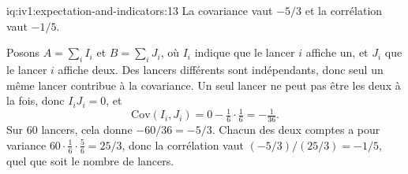 \enlargethispage{-3\baselineskip}%
\begin{solution}{iq:iv1:expectation-and-indicators:13}
La covariance vaut $-5/3$ et la corrélation vaut $-1/5$.

Posons $A = \sum_i I_i$ et $B = \sum_i J_i$, où $I_i$ indique que le lancer $i$ affiche un, et $J_i$ que le lancer $i$ affiche deux. Des lancers différents sont
indépendants, donc seul un même lancer contribue à la covariance. Un seul lancer ne peut pas être les deux à la fois, donc $I_iJ_i = 0$, et
\[
\mathrm{Cov}(I_i, J_i) = 0 - \tfrac16 \cdot \tfrac16 = -\tfrac{1}{36}.
\]
Sur 60 lancers, cela donne $-60/36 = -5/3$. Chacun des deux comptes a pour variance $60 \cdot \tfrac16 \cdot \tfrac56 = 25/3$, donc la corrélation vaut
$(-5/3)/(25/3) = -1/5$, quel que soit le nombre de lancers.

\end{solution}

